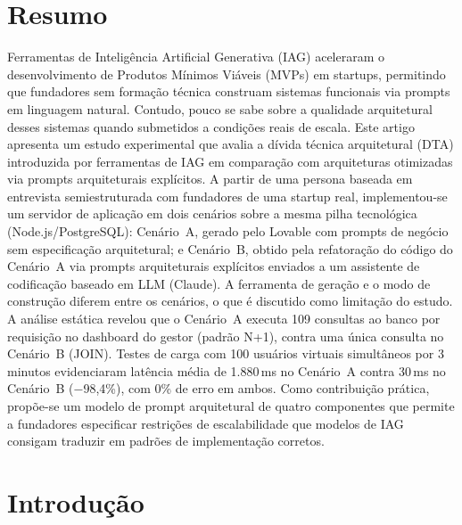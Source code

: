 \documentclass[sigconf]{acmart}
\begin{document}

\frenchspacing
\maketitle

\section*{Resumo}
Ferramentas de Inteligência Artificial Generativa (IAG) aceleraram o desenvolvimento
de Produtos Mínimos Viáveis (MVPs) em startups, permitindo que fundadores sem formação
técnica construam sistemas funcionais via prompts em linguagem natural. Contudo, pouco
se sabe sobre a qualidade arquitetural desses sistemas quando submetidos a condições
reais de escala. Este artigo apresenta um estudo experimental que avalia a dívida técnica
arquitetural (DTA) introduzida por ferramentas de IAG em comparação com arquiteturas
otimizadas via prompts arquiteturais explícitos. A partir de uma persona baseada em
entrevista semiestruturada com fundadores de uma startup real, implementou-se um servidor
de aplicação em dois cenários sobre a mesma pilha tecnológica (Node.js/PostgreSQL):
Cenário~A, gerado pelo Lovable com prompts de negócio sem especificação arquitetural;
e Cenário~B, obtido pela refatoração do código do Cenário~A via prompts arquiteturais
explícitos enviados a um assistente de codificação baseado em LLM (Claude). A ferramenta
de geração e o modo de construção diferem entre os cenários, o que é discutido como
limitação do estudo. A análise estática
revelou que o Cenário~A executa 109 consultas ao banco por requisição no dashboard do
gestor (padrão N+1), contra uma única consulta no Cenário~B (JOIN). Testes de carga
com 100 usuários virtuais simultâneos por 3 minutos evidenciaram latência média de
1.880\,ms no Cenário~A contra 30\,ms no Cenário~B (−98,4\%), com 0\% de erro em
ambos. Como contribuição prática, propõe-se um modelo de prompt arquitetural de quatro
componentes que permite a fundadores especificar restrições de escalabilidade que
modelos de IAG consigam traduzir em padrões de implementação corretos.


\section{Introdução}
\end{document}
